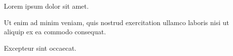 \documentclass{article}
\begin{document}
Lorem ipsum dolor sit amet.

\begin{clozepar}
Ut enim ad minim veniam, quis nostrud exercitation ullamco laboris nisi
ut aliquip ex ea commodo consequat.
\end{clozepar}


Excepteur sint occaecat.
\end{document}
